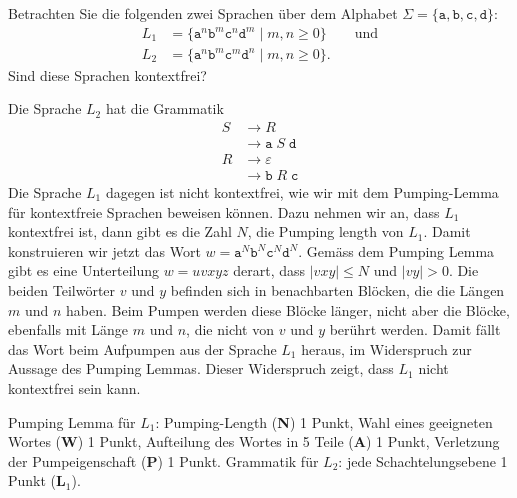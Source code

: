 Betrachten Sie die folgenden zwei Sprachen über dem Alphabet
$\Sigma=\{\texttt{a},\texttt{b},\texttt{c}, \texttt{d}\}$:
\begin{align*}
L_1
&=
\{ \texttt{a}^n\texttt{b}^m\texttt{c}^n\texttt{d}^m
\;|\; m,n\ge 0
\}
\qquad\text{und}
\\
L_2
&=
\{ \texttt{a}^n\texttt{b}^m\texttt{c}^m\texttt{d}^n
\;|\; m,n\ge 0
\}.
\end{align*}
Sind diese Sprachen kontextfrei?

\begin{loesung}
Die Sprache $L_2$ hat die Grammatik
\begin{align*}
S&\rightarrow R
\\
 &\rightarrow \texttt{a}\; S \;\texttt{d}
\\
R&\rightarrow \varepsilon
\\
 &\rightarrow \texttt{b}\; R \;\texttt{c}
\end{align*}
Die Sprache $L_1$ dagegen ist nicht kontextfrei, wie wir mit dem Pumping-Lemma
für kontextfreie Sprachen beweisen können.
Dazu nehmen wir an, dass $L_1$ kontextfrei ist, dann gibt es die Zahl $N$,
die Pumping length von $L_1$.
Damit konstruieren wir jetzt das Wort
$w=
\texttt{a}^N
\texttt{b}^N
\texttt{c}^N
\texttt{d}^N
$.
Gemäss dem Pumping Lemma gibt es eine Unterteilung $w=uvxyz$ derart,
dass $|vxy|\le N$ und $|vy|>0$.
Die beiden Teilwörter $v$ und $y$ befinden sich in benachbarten Blöcken,
die die Längen $m$ und $n$ haben.
Beim Pumpen werden diese Blöcke länger, nicht aber die Blöcke, ebenfalls
mit Länge $m$ und $n$, die nicht von $v$ und $y$ berührt werden.
Damit fällt das Wort beim Aufpumpen aus der Sprache $L_1$ heraus, im
Widerspruch zur Aussage des Pumping Lemmas.
Dieser Widerspruch zeigt, dass $L_1$  nicht kontextfrei sein kann.
\end{loesung}

\begin{bewertung}
Pumping Lemma für $L_1$: Pumping-Length ({\bf N}) 1 Punkt,
Wahl eines geeigneten Wortes ({\bf W}) 1 Punkt,
Aufteilung des Wortes in 5 Teile ({\bf A}) 1 Punkt,
Verletzung der Pumpeigenschaft ({\bf P}) 1 Punkt.
Grammatik für $L_2$: jede Schachtelungsebene 1 Punkt ($\textbf{L}_1$).
\end{bewertung}


